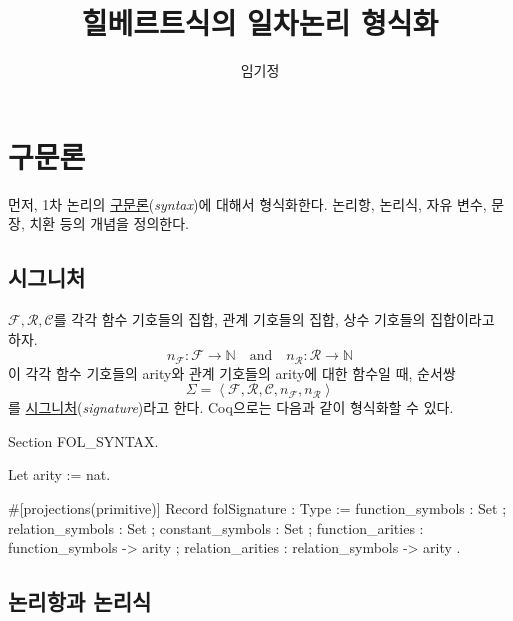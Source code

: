 \documentclass[12pt]{paper}
\title{힐베르트식의 일차논리 형식화}
\author{임기정}
\begin{document}
\maketitle

\section{구문론}

먼저, 1차 논리의 \underline{구문론}(\textit{syntax})에 대해서 형식화한다.
논리항, 논리식, 자유 변수, 문장, 치환 등의 개념을 정의한다.

\subsection{시그니처}

$\mathcal{F}, \mathcal{R}, \mathcal{C}$를
각각 함수 기호들의 집합, 관계 기호들의 집합, 상수 기호들의 집합이라고 하자.
$$n_\mathcal{F} : \mathcal{F} \to \mathbb{N} \quad \mathrm{and} \quad n_\mathcal{R} : \mathcal{R} \to \mathbb{N}$$
이 각각 함수 기호들의 arity와 관계 기호들의 arity에 대한 함수일 때, 순서쌍
$$ \Sigma = \left\langle \mathcal{F}, \mathcal{R}, \mathcal{C}, n_\mathcal{F} , n_\mathcal{R} \right\rangle $$
를 \underline{시그니처}(\textit{signature})라고 한다.
Coq으로는 다음과 같이 형식화할 수 있다.
\begin{coqcode}
Section FOL_SYNTAX.

Let arity := nat.
    
#[projections(primitive)]
Record folSignature : Type :=
  { function_symbols : Set
  ; relation_symbols : Set
  ; constant_symbols : Set
  ; function_arities : function_symbols -> arity
  ; relation_arities : relation_symbols -> arity
  }.
\end{coqcode}

\newpage

\subsection[short]{논리항과 논리식}
\end{document}
